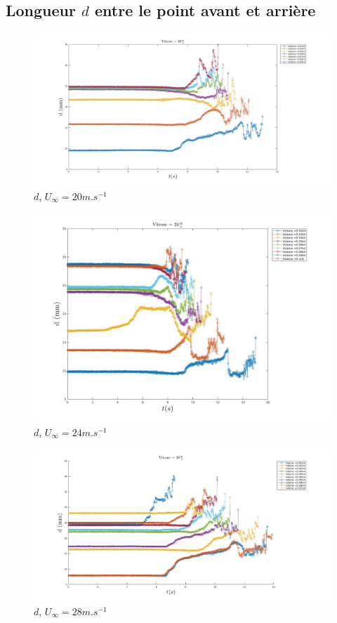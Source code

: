 \documentclass[french]{article}
\begin{document}
\subsection{Longueur $d$ entre le point avant et arrière}
\begin{figure}[h]
	\centering
	\includegraphics[width = \linewidth]{./image/v=20d.jpg}
	\caption{$d$, $U_{\infty}=20m.s^{-1}$}
\end{figure}
\begin{figure}[h]
	\centering
	\includegraphics[width = \linewidth]{./image/v=24d.jpg}
	\caption{$d$, $U_{\infty}=24m.s^{-1}$}
\end{figure}
\begin{figure}[h]
	\centering
	\includegraphics[width = \linewidth]{./image/v=28d.jpg}
	\caption{$d$, $U_{\infty}=28m.s^{-1}$}
\end{figure}
\end{document}
